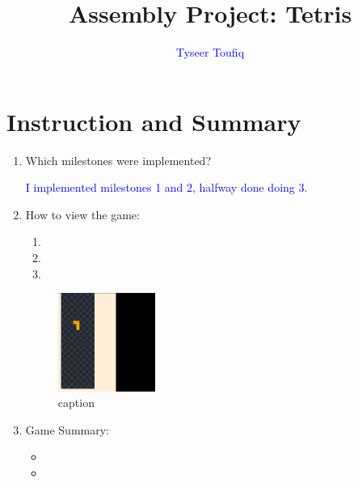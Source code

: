 \documentclass{article}
\title{Assembly Project: Tetris}
\author{\textcolor{blue}{Tyseer Toufiq}}
\begin{document}
\maketitle

\section{Instruction and Summary}

\begin{enumerate}

    \item Which milestones were implemented?   

\begin{flushleft}
\textcolor{blue}{I implemented milestones 1 and 2, halfway done doing 3}.
\end{flushleft}

    \item How to view the game:
    
    \begin{enumerate}

    \item
    \item
    \item


    \end{enumerate}

    

\begin{figure}[ht!]
    \centering
    \includegraphics[width=0.3\textwidth]{name.png}
    \caption{caption}
    \label{Instructions}
\end{figure}

\item Game Summary:
\begin{itemize}
\item
\item
\end{itemize}

    
\end{enumerate}
\end{document}
